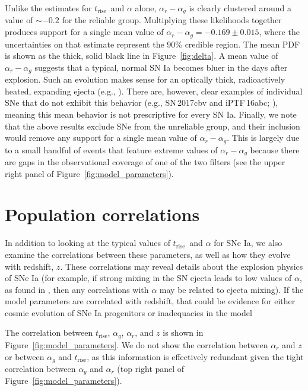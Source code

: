 \documentclass[twocolumn]{./aastex63}
\newcommand{\trise}{$t_\mathrm{rise}$}
\begin{document}
Unlike the estimates for \trise\ and $\alpha$ alone, $\alpha_r - \alpha_g$ is
clearly clustered around a value of $\sim{-0.2}$ for the reliable group.
Multiplying these likelihoods together produces support for a single mean
value of $\alpha_r - \alpha_g = -0.169 \pm 0.015$, where the uncertainties on
that estimate represent the 90\% credible region. The mean PDF is shown as the
thick, solid black line in Figure~\ref{fig:delta}. A mean value of $\alpha_r -
\alpha_g$ suggests that a typical, normal SN Ia becomes bluer in the days
after explosion. Such an evolution makes sense for an optically thick,
radioactively heated, expanding ejecta (e.g., \citealt{Piro16}). There are,
however, clear examples of individual SNe that do not exhibit this behavior
(e.g., SN\,2017cbv and iPTF\,16abc; \citealt{Hosseinzadeh17,Miller18}),
meaning this mean behavior is not prescriptive for every SN Ia. Finally, we
note that the above results exclude SNe from the unreliable group, and their
inclusion would remove any support for a single mean value of $\alpha_r -
\alpha_g$. This is largely due to a small handful of events that feature
extreme values of $\alpha_r - \alpha_g$ because there are gaps in the
observational coverage of one of the two filters (see the upper right panel of
Figure~\ref{fig:model_parameters}).

\section{Population correlations}

In addition to looking at the typical values of \trise\ and $\alpha$ for SNe
Ia, we also examine the correlations between these parameters, as well as how
they evolve with redshift, $z$. These correlations may reveal details about
the explosion physics of SNe Ia (for example, if strong mixing in the SN
ejecta leads to low values of $\alpha$, as found in \citealt{Piro16}, then any
correlations with $\alpha$ may be related to ejecta mixing). If the model
parameters are correlated with redshift, that could be evidence for either
cosmic evolution of SNe Ia progenitors or inadequacies in the model

The correlation between $t_\mathrm{rise}$, $\alpha_g$, $\alpha_r$, and $z$ is
shown in Figure~\ref{fig:model_parameters}. We do not show the correlation
between $\alpha_r$ and $z$ or between $\alpha_g$ and \trise, as this
information is effectively redundant given the tight correlation between
$\alpha_g$ and $\alpha_r$ (top right panel of
Figure~\ref{fig:model_parameters}).
\end{document}
